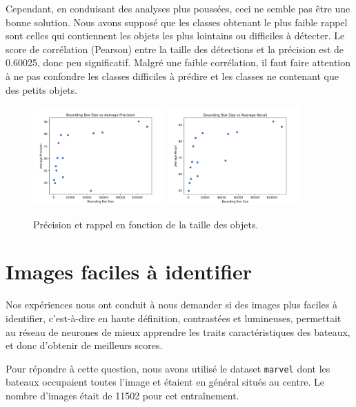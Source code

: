 Cependant, en conduisant des analyses plus poussées, ceci ne semble pas être une bonne solution. Nous avons supposé que les classes obtenant le plus faible rappel sont celles qui contiennent les objets les plus lointains ou difficiles à détecter.
Le score de corrélation  (Pearson) entre la taille des détections et la précision est de 0.60025, donc peu significatif. Malgré une faible corrélation, il faut faire attention à ne pas confondre les classes
difficiles à prédire et les classes ne contenant que des petits objets.

\begin{figure}[H]
    \centering
    \includegraphics[width=0.45\textwidth]{./img/size_precision.png}
    \includegraphics[width=0.45\textwidth]{./img/size_recall.png}
    \caption{Précision et rappel en fonction de la taille des objets.}
\end{figure}

\section{Images faciles à identifier}

Nos expériences nous ont conduit à nous demander si des images plus faciles à identifier, c'est-à-dire
en haute définition, contrastées et lumineuses, permettait au réseau de neurones de mieux apprendre les
traits caractéristiques des bateaux, et donc d'obtenir de meilleurs scores.

Pour répondre à cette question, nous avons utilisé le dataset \texttt{marvel} dont les bateaux occupaient
toutes l'image et étaient en général situés au centre. Le nombre d'images était de 11502 pour cet entraînement. \\

